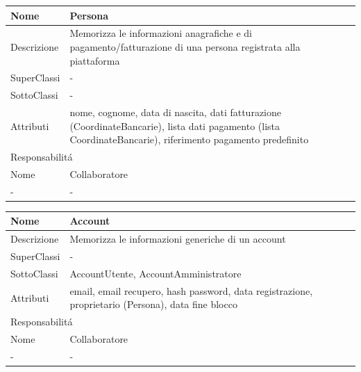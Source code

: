 \begin{center} %
    \begin{longtable}{ |p{3cm}|p{3cm}|p{3cm}|p{3cm}| }
        \hline
        Nome & \multicolumn{3}{|p{9cm}|}{Persona} \\\hline
        Descrizione & \multicolumn{3}{|p{9cm}|}{Memorizza le informazioni anagrafiche e di pagamento/fatturazione di una persona registrata alla piattaforma} \\\hline
        SuperClassi & \multicolumn{3}{|p{9cm}|}{-} \\\hline
        SottoClassi & \multicolumn{3}{|p{9cm}|}{-} \\\hline
        Attributi & \multicolumn{3}{|p{9cm}|}{nome, cognome, data di nascita, dati fatturazione (CoordinateBancarie), lista dati pagamento (lista CoordinateBancarie), riferimento pagamento predefinito} \\\hline
        \multicolumn{4}{|p{12cm}|}{Responsabilit\'a} \\\hline %
        \multicolumn{2}{|p{6cm}|}{Nome} & \multicolumn{2}{|p{6cm}|}{Collaboratore} \\\hline %
        \multicolumn{2}{|p{6cm}|}{-} & \multicolumn{2}{|p{6cm}|}{-} \\\hline
    \end{longtable}
\end{center}

\begin{center} %
    \begin{longtable}{ |p{3cm}|p{3cm}|p{3cm}|p{3cm}| }
        \hline
        Nome & \multicolumn{3}{|p{9cm}|}{Account} \\\hline
        Descrizione & \multicolumn{3}{|p{9cm}|}{Memorizza le informazioni generiche di un account} \\\hline
        SuperClassi & \multicolumn{3}{|p{9cm}|}{-} \\\hline
        SottoClassi & \multicolumn{3}{|p{9cm}|}{AccountUtente, AccountAmministratore} \\\hline
        Attributi & \multicolumn{3}{|p{9cm}|}{email, email recupero, hash password, data registrazione, proprietario (Persona), data fine blocco} \\\hline
        \multicolumn{4}{|p{12cm}|}{Responsabilit\'a} \\\hline %
        \multicolumn{2}{|p{6cm}|}{Nome} & \multicolumn{2}{|p{6cm}|}{Collaboratore} \\\hline %
        \multicolumn{2}{|p{6cm}|}{-} & \multicolumn{2}{|p{6cm}|}{-} \\\hline
    \end{longtable}
\end{center}

